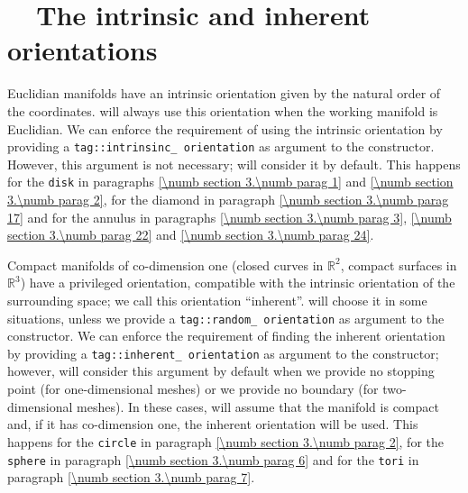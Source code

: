 \section{~~The intrinsic and inherent orientations}\label{\numb section 3.\numb parag 13}

Euclidian manifolds have an intrinsic orientation given by the natural order of the
coordinates.
{\ManiFEM} will always use this orientation when the working manifold is Euclidian.
We can enforce the requirement of using the intrinsic orientation by providing a
{\small\tt \textcolor{tag}{tag}::intrinsinc\_\,orien\-tation} as argument to the {\small\tt {}} constructor.
However, this argument is not necessary; {\maniFEM} will consider it by default.
This happens for the {\small\tt disk} in paragraphs \ref{\numb section 3.\numb parag 1} and
\ref{\numb section 3.\numb parag 2}, for the diamond in
paragraph \ref{\numb section 3.\numb parag 17} and for the annulus in paragraphs
\ref{\numb section 3.\numb parag 3}, \ref{\numb section 3.\numb parag 22}
and \ref{\numb section 3.\numb parag 24}.

Compact manifolds of co-dimension one (closed curves in $ \mathbb{R}^2 $,
compact surfaces in $ \mathbb{R}^3 $) have a privileged orientation,
compatible with the intrinsic orientation of the surrounding space;
we call this orientation ``inherent''.
{\ManiFEM} will choose it in some situations, unless we provide a
{\small\tt \textcolor{tag}{tag}::random\_\,orientation} as argument to the {\small\tt {}} constructor.
We can enforce the requirement of finding the inherent orientation by providing a
{\small\tt \textcolor{tag}{tag}::inherent\_\,orientation} as argument to the {\small\tt {}} constructor;
however, {\maniFEM} will consider this argument by default when we provide no stopping
point (for one-dimensional meshes) or we provide no boundary (for two-dimensional meshes).
In these cases, {\maniFEM} will assume that the manifold is compact and, if it has
co-dimension one, the inherent orientation will be used.
This happens for the {\small\tt circle} in paragraph \ref{\numb section 3.\numb parag 2},
for the {\small\tt sphere} in paragraph \ref{\numb section 3.\numb parag 6} and for the
{\small\tt tori} in paragraph \ref{\numb section 3.\numb parag 7}.

